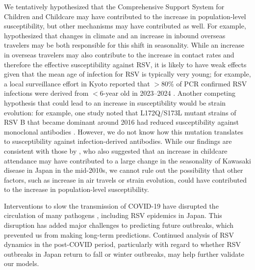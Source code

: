 \documentclass[12pt]{article}
\begin{document}
We tentatively hypothesized that the Comprehensive Support System for Children and Childcare may have contributed to the increase in population-level susceptibility, but other mechanisms may have contributed as well.
For example, \cite{wagatsuma2021shifts} hypothesized that changes in climate and an increase in inbound overseas travelers may be both responsible for this shift in seasonality.
While an increase in overseas travelers may also contribute to the increase in contact rates and therefore the effective susceptibility against RSV, it is likely to have weak effects given that the mean age of infection for RSV is typically very young;
for example, a local surveillance effort in Kyoto reported that $>80\%$ of PCR confirmed RSV infections were derived from $<6$-year old in 2023--2024 \citep{matsumura2025epidemiology}.
Another competing hypothesis that could lead to an increase in susceptibility would be strain evolution:
for example, one study noted that L172Q/S173L mutant strains of RSV B that became dominant around 2016 had reduced susceptibility against monoclonal antibodies \citep{okabe2024amino}.
However, we do not know how this mutation translates to susceptibility against infection-derived antibodies.
While our findings are consistent with those by \cite{dehaan2024age}, who also suggested that an increase in childcare attendance may have contributed to a large change in the seasonality of Kawasaki disease in Japan in the mid-2010s, we cannot rule out the possibility that other factors, such as increase in air travels or strain evolution, could have contributed to the increase in population-level susceptibility.

Interventions to slow the transmission of COVID-19 have disrupted the circulation of many pathogens \citep{baker2020impact,eden2022off,chen2024covid,park2024predicting}, including RSV epidemics in Japan.
This disruption has added major challenges to predicting future outbreaks, which prevented us from making long-term predictions.
Continued analysis of RSV dynamics in the post-COVID period, particularly with regard to whether RSV outbreaks in Japan return to fall or winter outbreaks, may help further validate our models.
\end{document}

